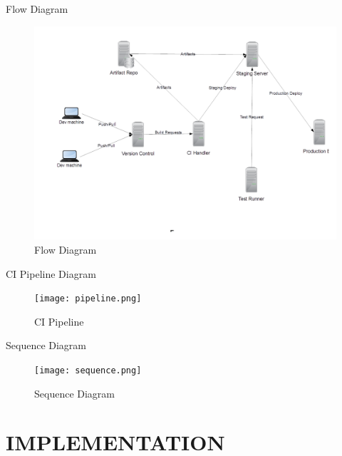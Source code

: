 \documentclass{beamer}
\begin{document}
\begin{frame}{Flow Diagram}

\begin{figure}[h]
\begin{center}
\includegraphics[scale=0.28]{flow1.png}
\caption{Flow Diagram}
\end{center}
\end{figure}
\end{frame}

\begin{frame}{CI Pipeline Diagram}

\begin{figure}[h]
\begin{center}
\texttt{[image: pipeline.png]}
\caption{CI Pipeline}
\end{center}
\end{figure}
\end{frame}

\begin{frame}{Sequence Diagram}

\begin{figure}[h]
\begin{center}
\texttt{[image: sequence.png]}
\caption{Sequence Diagram}
\end{center}
\end{figure}
\end{frame}

\section{IMPLEMENTATION}
\end{document}
